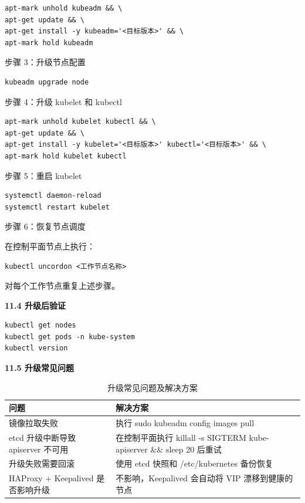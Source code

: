 \documentclass[12pt,UTF8]{ctexbook}
\begin{document}
\begin{lstlisting}
apt-mark unhold kubeadm && \
apt-get update && \
apt-get install -y kubeadm='<目标版本>' && \
apt-mark hold kubeadm
\end{lstlisting}

步骤 3：升级节点配置

\begin{lstlisting}
kubeadm upgrade node
\end{lstlisting}

步骤 4：升级 kubelet 和 kubectl

\begin{lstlisting}
apt-mark unhold kubelet kubectl && \
apt-get update && \
apt-get install -y kubelet='<目标版本>' kubectl='<目标版本>' && \
apt-mark hold kubelet kubectl
\end{lstlisting}

步骤 5：重启 kubelet

\begin{lstlisting}
systemctl daemon-reload
systemctl restart kubelet
\end{lstlisting}

步骤 6：恢复节点调度

在控制平面节点上执行：

\begin{lstlisting}
kubectl uncordon <工作节点名称>
\end{lstlisting}

对每个工作节点重复上述步骤。

\textbf{11.4 升级后验证}

\begin{lstlisting}
kubectl get nodes
kubectl get pods -n kube-system
kubectl version
\end{lstlisting}

\textbf{11.5 升级常见问题}

\begin{table}[htbp]
    \centering
    \begin{tabular}{|p{6cm}|p{9cm}|}
        \hline
        \textbf{问题} & \textbf{解决方案} \\
        \hline
        镜像拉取失败 & 执行 sudo kubeadm config images pull \\
        \hline
        etcd 升级中断导致 apiserver 不可用 & 在控制平面执行 killall -s SIGTERM kube-apiserver \&\& sleep 20 后重试 \\
        \hline
        升级失败需要回滚 & 使用 etcd 快照和 /etc/kubernetes 备份恢复 \\
        \hline
        HAProxy + Keepalived 是否影响升级 & 不影响，Keepalived 会自动将 VIP 漂移到健康的节点 \\
        \hline
    \end{tabular}
    \caption{升级常见问题及解决方案}
\end{table}
\end{document}
